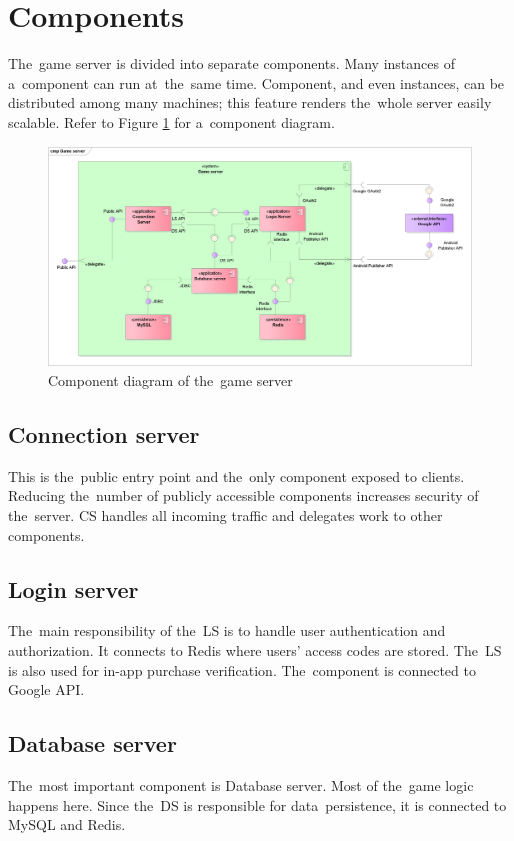 \section{Components}
The~game server is divided into separate components. Many instances of a~component can run at~the~same time. Component, and even instances, can be distributed among many machines; this feature renders the~whole server easily scalable. Refer to Figure \ref{fig:components} for a~component diagram.

\begin{figure}[h]	
	\includegraphics[width=\textwidth]{figures/Components}
	\centering			
	\caption{Component diagram of the~game server}
	\label{fig:components}
\end{figure}

	\subsection{Connection server}
	This is the~public entry point and the~only component exposed to clients. Reducing the~number of publicly accessible components increases security of the~server. CS handles all incoming traffic and delegates work to other components. 
	
	\subsection{Login server}
	The~main responsibility of the~LS is to handle user authentication and authorization. It connects to Redis where users' access codes are stored. The~LS is also used for in-app purchase verification. The~component is connected to Google API.
	
	\subsection{Database server}
	The~most important component is Database server. Most of the~game logic happens here. Since the~DS is responsible for data~persistence, it is connected to MySQL and Redis.

